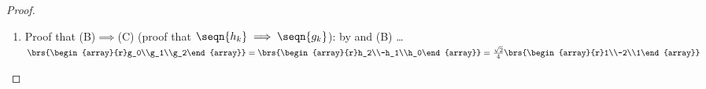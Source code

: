 \begin{proof}
\begin{enumerate}
\begin{enumerate}
      \item Proof for the values of $\seqn{h_k}$ (B):\label{item:N1_hg_h}
            by  and  \ldots
            \\\indentx$
              \brs{\begin{array}{r}h_0\\h_1\\h_2\end{array}}
                 = \opAi\opA\brs{\begin{array}{r}h_0\\h_1\\h_2\end{array}}
                 = \opAi\brs{\begin{array}{r}\sqrt{2}\\0\\0\end{array}}
                 = \frac{1}{4}\brs{\begin{array}{rrr}1 & 3 & -2\\
                                                     2 &-2 &  0\\
                                                     1 &-1 &  2\end{array}}
                              \brs{\begin{array}{r}\sqrt{2}\\0\\0\end{array}}
                 = \frac{\sqrt{2}}{4}\brs{\begin{array}{r}1\\2\\1\end{array}}
            $
    \end{enumerate}

  \item Proof that (B)$\implies$(C) (proof that $\seqn{h_k}\implies\seqn{g_k}$): %
        by   and (B) \ldots
        \\\indentx$
            \brs{\begin{array}{r}g_0\\g_1\\g_2\end{array}}
              = \brs{\begin{array}{r}h_2\\-h_1\\h_0\end{array}}
              = \frac{\sqrt{2}}{4}\brs{\begin{array}{r}1\\-2\\1\end{array}}
        $


\end{enumerate}
\end{proof}
